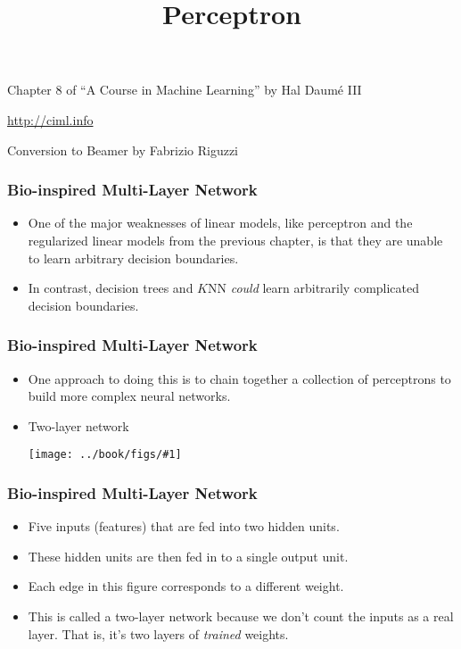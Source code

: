 \documentclass[trans]{beamer}
\title[Perceptron]
{Perceptron}
\institute[] %
{
}
\date{}
\newcommand{\myalert}[1]{{%
 #1}}
\begin{document}
\begin{frame}
\titlepage 
\vspace{-2cm}
\begin{center}
Chapter 8 of ``A Course in  Machine Learning'' by Hal Daum\'e III

\url{http://ciml.info}

Conversion to Beamer by Fabrizio Riguzzi
\end{center}


\end{frame}
  \renewcommand{\concept}[1]{\myalert{#1}}
  \renewcommand{\koncept}[2]{\myalert{#1}}

\renewcommand{\Figure}[3]{%
    \begin{center}
    \texttt{[image: ../book/figs/\#1]}
    \end{center}
  }
  
\begin{frame}
  \frametitle{Bio-inspired Multi-Layer Network}
\begin{itemize}
\item 
One of the major weaknesses of linear models, like perceptron and the
regularized linear models from the previous chapter, is that they are unable to learn arbitrary decision
boundaries.
\item  In contrast, decision trees and $K$NN \emph{could} learn
arbitrarily complicated decision boundaries.
\end{itemize}
\end{frame}

\begin{frame}
  \frametitle{Bio-inspired Multi-Layer Network}
\begin{itemize}
\item 
One approach to doing this is to chain together a collection of
perceptrons to build more complex \concept{neural networks}. 
\item \concept{Two-layer network} 
\Figure{nnet:twolayer}{picture of a two-layer network with 5
  inputs and two hidden units}{0.4}
\end{itemize}
\end{frame}

\begin{frame}
  \frametitle{Bio-inspired Multi-Layer Network}
\begin{itemize}
\item Five inputs
(features) that are fed into two \concept{hidden units}.
\item  These hidden
units are then fed in to a single \concept{output unit}. 
\item
 Each edge in
this figure corresponds to a different weight.  
\item This is called a two-layer network
because we don't count the inputs as a real layer.  That is, it's two
layers of \emph{trained} weights.
\end{itemize}
\end{frame}
\end{document}
